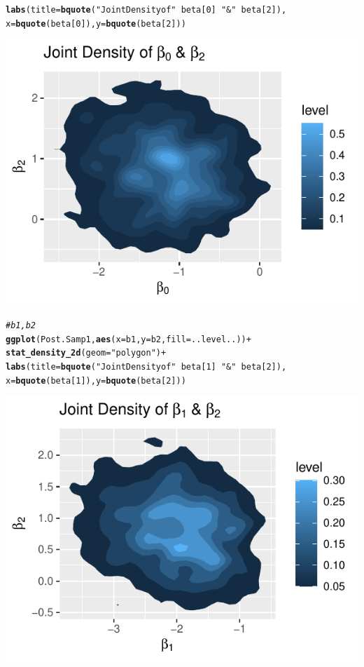 \documentclass[11pt,english]{article}\usepackage[]{graphicx}\usepackage[]{xcolor}
\makeatletter
\def\maxwidth{ %
  \ifdim\Gin@nat@width>\linewidth
    \linewidth
  \else
    \Gin@nat@width
  \fi
}
\newcommand{\hlnum}[1]{\textcolor[rgb]{0.686,0.059,0.569}{#1}}%
\newcommand{\hlstr}[1]{\textcolor[rgb]{0.192,0.494,0.8}{#1}}%
\newcommand{\hlcom}[1]{\textcolor[rgb]{0.678,0.584,0.686}{\textit{#1}}}%
\newcommand{\hlopt}[1]{\textcolor[rgb]{0,0,0}{#1}}%
\newcommand{\hlstd}[1]{\textcolor[rgb]{0.345,0.345,0.345}{#1}}%
\newcommand{\hlkwc}[1]{\textcolor[rgb]{0.333,0.667,0.333}{#1}}%
\newcommand{\hlkwd}[1]{\textcolor[rgb]{0.737,0.353,0.396}{\textbf{#1}}}%
\newenvironment{kframe}{%
 \def\at@end@of@kframe{}%
 \ifinner\ifhmode%
  \def\at@end@of@kframe{\end{minipage}}%
  \begin{minipage}{\columnwidth}%
 \fi\fi%
 \def\FrameCommand##1{\hskip\@totalleftmargin \hskip-\fboxsep
 \colorbox{shadecolor}{##1}\hskip-\fboxsep
     \hskip-\linewidth \hskip-\@totalleftmargin \hskip\columnwidth}%
 \MakeFramed {\advance\hsize-\width
   \@totalleftmargin\z@ \linewidth\hsize
   \@setminipage}}%
 {\par\unskip\endMakeFramed%
 \at@end@of@kframe}
\newenvironment{knitrout}{}{} %
\makeatother
\begin{document}
\begin{center}
\begin{knitrout}
\begin{kframe}
\begin{alltt}
\hlkwd{labs}\hlstd{(}\hlkwc{title} \hlstd{=} \hlkwd{bquote}\hlstd{(}\hlstr{"Joint Density of"} \hlopt{~} \hlstd{beta[}\hlnum{0}\hlstd{]} \hlopt{~} \hlstr{"&"} \hlopt{~} \hlstd{beta[}\hlnum{2}\hlstd{]),}
\hlkwc{x} \hlstd{=} \hlkwd{bquote}\hlstd{(beta[}\hlnum{0}\hlstd{]),} \hlkwc{y} \hlstd{=} \hlkwd{bquote}\hlstd{(beta[}\hlnum{2}\hlstd{]))}
\end{alltt}
\end{kframe}
\includegraphics[width=\maxwidth]{figure/unnamed-chunk-11-2} 
\begin{kframe}\begin{alltt}
\hlcom{# b1,b2}
\hlkwd{ggplot}\hlstd{(Post.Samp1,} \hlkwd{aes}\hlstd{(}\hlkwc{x} \hlstd{= b1,} \hlkwc{y} \hlstd{= b2,} \hlkwc{fill} \hlstd{= ..level..))} \hlopt{+}
  \hlkwd{stat_density_2d}\hlstd{(}\hlkwc{geom} \hlstd{=} \hlstr{"polygon"}\hlstd{)} \hlopt{+}
\hlkwd{labs}\hlstd{(}\hlkwc{title} \hlstd{=} \hlkwd{bquote}\hlstd{(}\hlstr{"Joint Density of"} \hlopt{~} \hlstd{beta[}\hlnum{1}\hlstd{]} \hlopt{~} \hlstr{"&"} \hlopt{~} \hlstd{beta[}\hlnum{2}\hlstd{]),}
\hlkwc{x} \hlstd{=} \hlkwd{bquote}\hlstd{(beta[}\hlnum{1}\hlstd{]),} \hlkwc{y} \hlstd{=} \hlkwd{bquote}\hlstd{(beta[}\hlnum{2}\hlstd{]))}
\end{alltt}
\end{kframe}
\includegraphics[width=\maxwidth]{figure/unnamed-chunk-11-3} 

\end{knitrout}
\end{center}
\end{document}
